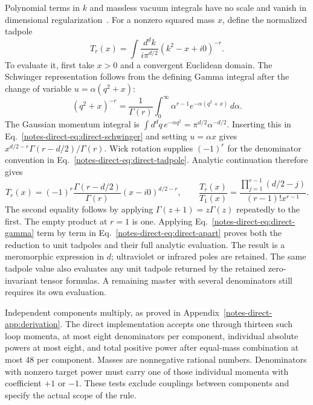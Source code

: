 \documentclass[11pt,a4paper]{article}
\begin{document}
Polynomial terms in $k$ and massless vacuum integrals have no scale and vanish in dimensional regularization~\cite{Weinzierl2022}. For a nonzero squared mass $x$, define the normalized tadpole
\begin{equation}
 T_r(x)=\int\frac{d^dk}{i\pi^{d/2}}(k^2-x+i0)^{-r}.
 \label{notes-direct-eq:direct-tadpole}
\end{equation}
To evaluate it, first take $x>0$ and a convergent Euclidean domain. The Schwinger representation follows from the defining Gamma integral after the change of variable $u=\alpha(q^2+x)$:
\begin{equation}
 (q^2+x)^{-r}=\frac{1}{\Gamma(r)}\int_0^\infty
 \alpha^{r-1}e^{-\alpha(q^2+x)}\,d\alpha.
 \label{notes-direct-eq:direct-schwinger}
\end{equation}
The Gaussian momentum integral is $\int d^dq\,e^{-\alpha q^2}=\pi^{d/2}\alpha^{-d/2}$. Inserting this in Eq.~\eqref{notes-direct-eq:direct-schwinger} and setting $u=\alpha x$ gives $x^{d/2-r}\Gamma(r-d/2)/\Gamma(r)$. Wick rotation supplies $(-1)^r$ for the denominator convention in Eq.~\eqref{notes-direct-eq:direct-tadpole}. Analytic continuation therefore gives
\begin{equation}
 T_r(x)=(-1)^r\frac{\Gamma(r-d/2)}{\Gamma(r)}(x-i0)^{d/2-r},\qquad
 \frac{T_r(x)}{T_1(x)}=
 \frac{\prod_{j=1}^{r-1}(d/2-j)}{(r-1)!x^{r-1}}.
 \label{notes-direct-eq:direct-gamma}
\end{equation}
The second equality follows by applying $\Gamma(z+1)=z\Gamma(z)$ repeatedly to the first. The empty product at $r=1$ is one. Applying Eq.~\eqref{notes-direct-eq:direct-gamma} term by term in Eq.~\eqref{notes-direct-eq:direct-apart} proves both the reduction to unit tadpoles and their full analytic evaluation. The result is a meromorphic expression in $d$; ultraviolet or infrared poles are retained. The same tadpole value also evaluates any unit tadpole returned by the retained zero-invariant tensor formulas. A remaining master with several denominators still requires its own evaluation.

Independent components multiply, as proved in Appendix~\ref{notes-direct-app:derivation}. The direct implementation accepts one through thirteen such loop momenta, at most eight denominators per component, individual absolute powers at most eight, and total positive power after equal-mass combination at most 48 per component. Masses are nonnegative rational numbers. Denominators with nonzero target power must carry one of those individual momenta with coefficient $+1$ or $-1$. These tests exclude couplings between components and specify the actual scope of the rule.
\end{document}
